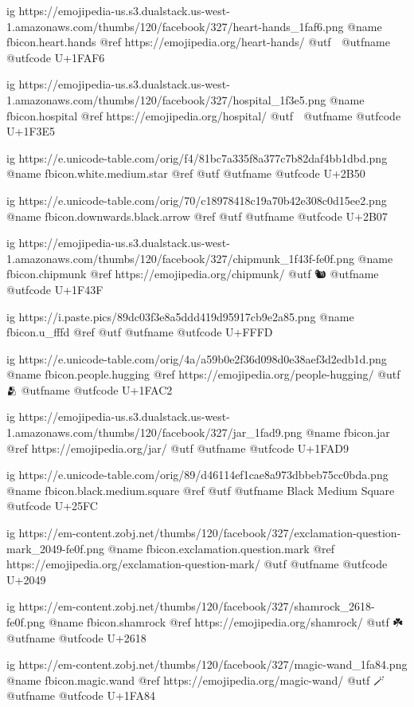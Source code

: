 	ig https://emojipedia-us.s3.dualstack.us-west-1.amazonaws.com/thumbs/120/facebook/327/heart-hands_1faf6.png
	@name fbicon.heart.hands
	@ref https://emojipedia.org/heart-hands/
	@utf 🫶
	@utfname
	@utfcode U+1FAF6

	ig https://emojipedia-us.s3.dualstack.us-west-1.amazonaws.com/thumbs/120/facebook/327/hospital_1f3e5.png
	@name fbicon.hospital
	@ref https://emojipedia.org/hospital/
	@utf 🏥
	@utfname
	@utfcode U+1F3E5

	ig https://e.unicode-table.com/orig/f4/81bc7a335f8a377c7b82daf4bb1dbd.png
	@name fbicon.white.medium.star
	@ref
	@utf
	@utfname
	@utfcode U+2B50

	ig https://e.unicode-table.com/orig/70/c18978418c19a70b42e308c0d15ee2.png
	@name fbicon.downwards.black.arrow
	@ref
	@utf
	@utfname
	@utfcode U+2B07

	ig https://emojipedia-us.s3.dualstack.us-west-1.amazonaws.com/thumbs/120/facebook/327/chipmunk_1f43f-fe0f.png
	@name fbicon.chipmunk
	@ref https://emojipedia.org/chipmunk/
	@utf 🐿️
	@utfname
	@utfcode U+1F43F

	ig https://i.paste.pics/89dc03f3e8a5ddd419d95917cb9e2a85.png
	@name fbicon.u_fffd
	@ref
	@utf
	@utfname
	@utfcode U+FFFD

	ig https://e.unicode-table.com/orig/4a/a59b0e2f36d098d0e38aef3d2edb1d.png
	@name fbicon.people.hugging
	@ref https://emojipedia.org/people-hugging/
	@utf 🫂
	@utfname
	@utfcode U+1FAC2

	ig https://emojipedia-us.s3.dualstack.us-west-1.amazonaws.com/thumbs/120/facebook/327/jar_1fad9.png
	@name fbicon.jar
	@ref https://emojipedia.org/jar/
	@utf
	@utfname
	@utfcode U+1FAD9

	ig https://e.unicode-table.com/orig/89/d46114ef1cae8a973dbbeb75cc0bda.png
	@name fbicon.black.medium.square
	@ref
	@utf
	@utfname Black Medium Square
	@utfcode U+25FC

	ig https://em-content.zobj.net/thumbs/120/facebook/327/exclamation-question-mark_2049-fe0f.png
	@name fbicon.exclamation.question.mark
	@ref https://emojipedia.org/exclamation-question-mark/
	@utf
	@utfname
	@utfcode U+2049

	ig https://em-content.zobj.net/thumbs/120/facebook/327/shamrock_2618-fe0f.png
	@name fbicon.shamrock
	@ref https://emojipedia.org/shamrock/
	@utf ☘️
	@utfname
	@utfcode U+2618

	ig https://em-content.zobj.net/thumbs/120/facebook/327/magic-wand_1fa84.png
	@name fbicon.magic.wand
	@ref https://emojipedia.org/magic-wand/
	@utf 🪄
	@utfname
	@utfcode U+1FA84


